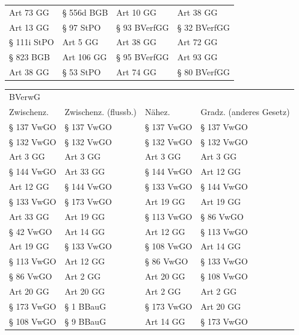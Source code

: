 \begin{tabular}{llll}
    Art 73 GG &           § 556d BGB &     Art 10 GG &               Art 38 GG \\
    Art 13 GG &            § 97 StPO &  § 93 BVerfGG &            § 32 BVerfGG \\
  § 111i StPO &             Art 5 GG &     Art 38 GG &               Art 72 GG \\
    § 823 BGB &           Art 106 GG &  § 95 BVerfGG &               Art 93 GG \\
    Art 38 GG &            § 53 StPO &     Art 74 GG &            § 80 BVerfGG \\
\bottomrule
\end{tabular}

\begin{tabular}{llll}
\toprule
\multicolumn{4}{l}{BVerwG} \\
   Zwischenz. & Zwischenz. (flussb.) &     Nähez. & Gradz. (anderes Gesetz) \\
\midrule
   § 137 VwGO &           § 137 VwGO & § 137 VwGO &              § 137 VwGO \\
   § 132 VwGO &           § 132 VwGO & § 132 VwGO &              § 132 VwGO \\
     Art 3 GG &             Art 3 GG &   Art 3 GG &                Art 3 GG \\
   § 144 VwGO &            Art 33 GG & § 144 VwGO &               Art 12 GG \\
    Art 12 GG &           § 144 VwGO & § 133 VwGO &              § 144 VwGO \\
   § 133 VwGO &           § 173 VwGO &  Art 19 GG &               Art 19 GG \\
    Art 33 GG &            Art 19 GG & § 113 VwGO &               § 86 VwGO \\
    § 42 VwGO &            Art 14 GG &  Art 12 GG &              § 113 VwGO \\
    Art 19 GG &           § 133 VwGO & § 108 VwGO &               Art 14 GG \\
   § 113 VwGO &            Art 12 GG &  § 86 VwGO &              § 133 VwGO \\
    § 86 VwGO &             Art 2 GG &  Art 20 GG &              § 108 VwGO \\
    Art 20 GG &            Art 20 GG &   Art 2 GG &                Art 2 GG \\
   § 173 VwGO &            § 1 BBauG & § 173 VwGO &               Art 20 GG \\
   § 108 VwGO &            § 9 BBauG &  Art 14 GG &              § 173 VwGO \\

\end{tabular}
